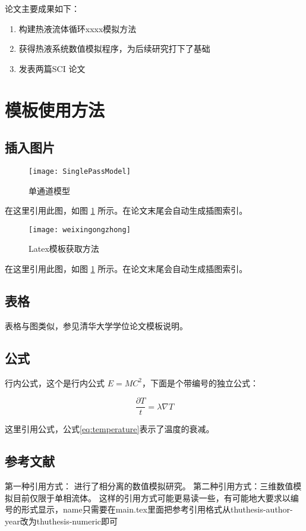 论文主要成果如下：

\begin{enumerate}
	\item 构建热液流体循环xxxx模拟方法
	\item 获得热液系统数值模拟程序，为后续研究打下了基础
	\item 发表两篇SCI 论文
\end{enumerate}



\section{模板使用方法}

\subsection{插入图片}
\begin{figure} [htbp] 
	\centering
	\texttt{[image: SinglePassModel]} 
	\caption[Single-pass model]{单通道模型} 
	\label{fig:singlepassmodel} 
\end{figure} 

在这里引用此图，如图 \ref{fig:singlepassmodel} 所示。在论文末尾会自动生成插图索引。


\begin{figure} [htbp] 
	\centering
	\texttt{[image: weixingongzhong]} 
	\caption[Single-pass model]{Latex模板获取方法} 
	\label{fig:template} 
\end{figure} 

在这里引用此图，如图 \ref{fig:singlepassmodel} 所示。在论文末尾会自动生成插图索引。

\subsection{表格}
表格与图类似，参见清华大学学位论文模板说明。

\subsection{公式}

行内公式，这个是行内公式 $E=MC^2$，下面是个带编号的独立公式：

\begin{equation}
	\frac{\partial T}{t} = \lambda \nabla T
	\label{eq:temperature}
\end{equation}

这里引用公式，公式\ref{eq:temperature}表示了温度的衰减。

\subsection{参考文献}
第一种引用方式：\cite{vehling2018implementation} 进行了相分离的数值模拟研究。
第二种引用方式：三维数值模拟目前仅限于单相流体\citep{coumou2008structure,coumou2006dynamics}。
这样的引用方式可能更易读一些，有可能地大要求以编号的形式显示，name只需要在main.tex里面把参考引用格式从{thuthesis-author-year}改为{thuthesis-numeric即可}